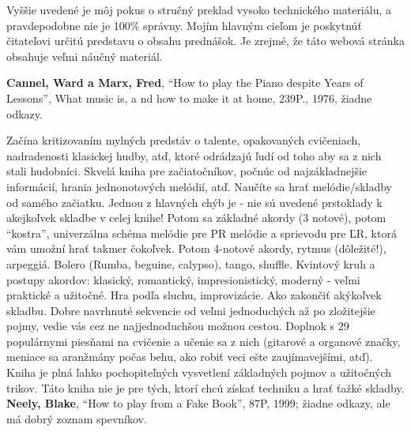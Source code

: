 \documentclass[11pt,a4paper]{book}
\begin{document}
Vyššie uvedené je môj pokus o stručný preklad vysoko technického materiálu, a pravdepodobne nie je 100\% správny. Mojím hlavným cieľom je poskytnúť čitateľovi určitú predstavu o obsahu prednášok. Je zrejmé, že táto webová stránka obsahuje veľmi náučný materiál. 

\textbf{Cannel, Ward a Marx, Fred}, “How to play the Piano despite Years of Lessons”, What music is, a nd how to make it at home, 239P., 1976, žiadne odkazy. 

Začína kritizovaním mylných predstáv o talente, opakovaných cvičeniach, nadradenosti klasickej hudby, atď, ktoré odrádzajú ľudí od toho aby sa z nich stali hudobníci. Skvelá kniha pre začiatočníkov, počnúc od najzákladnejšie informácií, hrania jednonotových melódií, atď. Naučíte sa hrať melódie/skladby od samého začiatku. Jednou z hlavných chýb je - nie sú uvedené prstoklady k akejkoľvek skladbe v celej knihe! Potom sa základné akordy (3 notové), potom “kostra”, univerzálna schéma melódie pre PR melódie a sprievodu pre ĽR, ktorá vám umožní hrať takmer čokoľvek. Potom 4-notové akordy, rytmus (dôležité!), arpeggiá. Bolero (Rumba, beguine, calypso), tango, shuffle. Kvintový kruh a postupy akordov: klasický, romantický, impresionistický, moderný - veľmi praktické a užitočné. Hra podľa sluchu, improvizácie. Ako zakončiť akýkoľvek skladbu. Dobre navrhnuté sekvencie od veľmi jednoduchých až po zložitejšie pojmy, vedie vás cez ne najjednoduchšou možnou cestou. Doplnok s 29 populárnymi piesňami na cvičenie a učenie sa z nich (gitarové a organové značky, meniace sa aranžmány počas behu, ako robiť veci ešte zaujímavejšími, atď). Kniha je plná ľahko pochopiteľných vysvetlení základných pojmov a užitočných trikov. Táto kniha nie je pre tých, ktorí chcú získať techniku a hrať ťažké skladby.
\medskip\\
\textbf{Neely, Blake}, “How to play from a Fake Book”, 87P, 1999; žiadne odkazy, ale má dobrý zoznam spevníkov. 
\end{document}
